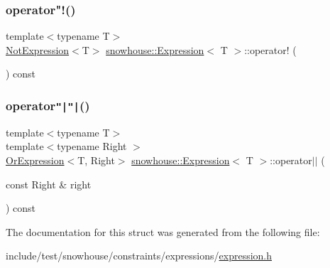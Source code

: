 \mbox{\label{structsnowhouse_1_1Expression_ae4d059058cf45bd82ff171d4ea2a1bdd}} 
\subsubsection{\texorpdfstring{operator"!()}{operator!()}}
{\footnotesize\ttfamily template$<$typename T$>$ \\
\mbox{\hyperlink{structsnowhouse_1_1NotExpression}{Not\+Expression}}$<$T$>$ \mbox{\hyperlink{structsnowhouse_1_1Expression}{snowhouse\+::\+Expression}}$<$ T $>$\+::operator! (\begin{DoxyParamCaption}{ }\end{DoxyParamCaption}) const\hspace{0.3cm}{\ttfamily [inline]}}

\mbox{\label{structsnowhouse_1_1Expression_a45b684f655be24a0ef5f79e2568735d9}} 
\subsubsection{\texorpdfstring{operator\texttt{"|}\texttt{"|}()}{operator||()}}
{\footnotesize\ttfamily template$<$typename T$>$ \\
template$<$typename Right $>$ \\
\mbox{\hyperlink{structsnowhouse_1_1OrExpression}{Or\+Expression}}$<$T, Right$>$ \mbox{\hyperlink{structsnowhouse_1_1Expression}{snowhouse\+::\+Expression}}$<$ T $>$\+::operator$\vert$$\vert$ (\begin{DoxyParamCaption}\item[{const Right \&}]{right }\end{DoxyParamCaption}) const\hspace{0.3cm}{\ttfamily [inline]}}



The documentation for this struct was generated from the following file\+:\begin{DoxyCompactItemize}
\item 
include/test/snowhouse/constraints/expressions/\mbox{\hyperlink{expression_8h}{expression.\+h}}\end{DoxyCompactItemize}
